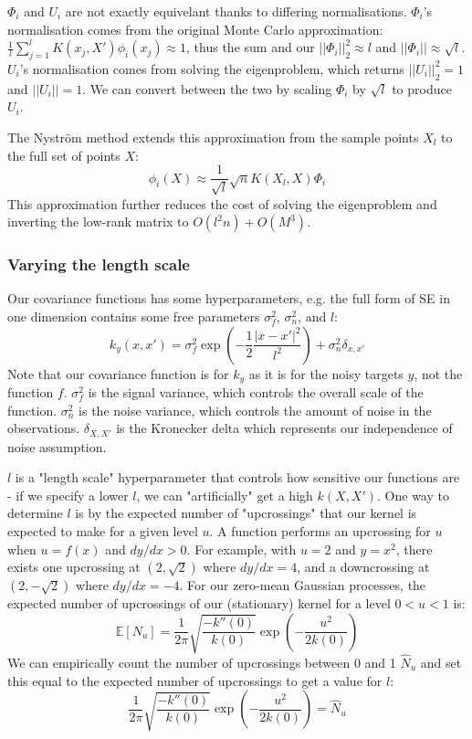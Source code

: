 $\Phi_i$ and $U_i$ are not exactly equivelant thanks to differing normalisations. $\Phi_i$'s normalisation comes from the original Monte Carlo approximation: $\frac{1}{l} \sum_{j=1}^{l} K(x_j, X') \phi_i(x_j) \approx 1$, thus the sum and our $||\Phi_i||_2^2 \approx l$ and $||\Phi_i|| \approx \sqrt{l}$. $U_i$'s normalisation comes from solving the eigenproblem, which returns $||U_i||_2^2 = 1$ and $||U_i|| = 1$. We can convert between the two by scaling $\Phi_i$ by $\sqrt{l}$ to produce $U_i$.

The Nyström method \cite{nystrom} extends this approximation from the sample points $X_l$ to the full set of points $X$:
\begin{equation*}
    \phi_i(X) \approx \frac{1}{\sqrt{l}} \sqrt{n} K(X_l, X) \Phi_i
\end{equation*}
This approximation further reduces the cost of solving the eigenproblem and inverting the low-rank matrix to $O(l^2 n) + O(M^3)$.


\subsubsection{Varying the length scale}
Our covariance functions has some hyperparameters, e.g. the full form of SE in one dimension contains some free parameters $\sigma^2_f$, $\sigma^2_n$, and $l$:
\begin{equation*}
    k_y(x,x') = \sigma^2_f \exp\left(-\frac{1}{2}\frac{|x - x'|^2}{l^2}\right) + \sigma^2_n\delta_{x,x'}
\end{equation*}
Note that our covariance function is for $k_y$ as it is for the noisy targets $y$, not the function $f$. $\sigma^2_f$ is the signal variance, which controls the overall scale of the function. $\sigma^2_n$ is the noise variance, which controls the amount of noise in the observations. $\delta_{X,X'}$ is the Kronecker delta which represents our independence of noise assumption.

$l$ is a "length scale" hyperparameter that controls how sensitive our functions are - if we specify a lower $l$, we can "artificially" get a high $k(X,X')$. One way to determine $l$ is by the expected number of "upcrossings" that our kernel is expected to make for a given level $u$. A function performs an upcrossing for $u$ when $u = f(x)$ and $dy/dx > 0$. For example, with $u = 2$ and $y = x^2$, there exists one upcrossing at $(2, \sqrt{2})$ where $dy/dx = 4$, and a downcrossing at $(2, -\sqrt{2})$ where $dy/dx = -4$. For our zero-mean Gaussian processes, the expected number of upcrossings of our (stationary) kernel for a level $ 0 < u < 1$ is:
\begin{equation*}
    \mathbb{E}[N_u] = \frac{1}{2\pi} \sqrt{\frac{-k''(0)}{k(0)}} \exp \left(-\frac{u^2}{2k(0)}\right)
\end{equation*}
We can empirically count the number of upcrossings between 0 and 1 $\hat{N}_u$ and set this equal to the expected number of upcrossings to get a value for $l$:
\begin{equation} \label{eq:general_l}
    \frac{1}{2\pi} \sqrt{\frac{-k''(0)}{k(0)}} \exp \left(-\frac{u^2}{2k(0)}\right) = \hat{N}_u
\end{equation}

